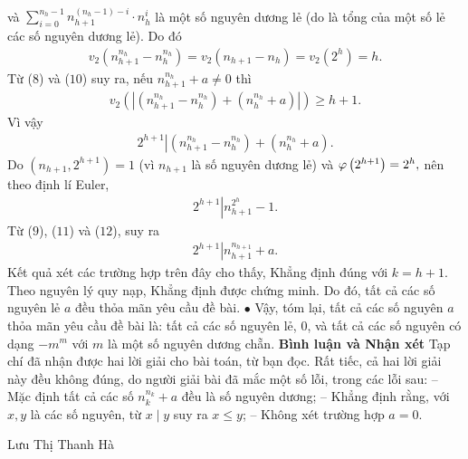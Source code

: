 \begin{multicols}{2}
\begin{align*}
	\end{align*}
	và $\sum\limits_{i = 0}^{{n_h} - 1} {n_{h + 1}^{\left( {{n_h} - 1} \right) - i} \cdot n_h^i}$  là một số nguyên dương lẻ (do là tổng của một số lẻ các số nguyên dương lẻ).
	\vskip 0.05cm
	Do đó
	\begin{align*}
		{v_2}\left( {n_{h + 1}^{{n_h}} - n_h^{{n_h}}} \right) = {v_2}\left( {{n_{h + 1}} - {n_h}} \right) = {v_2}\left( {{2^h}} \right) = h. \tag{$10$}
	\end{align*}
	Từ ($8$) và ($10$) suy ra, nếu  $n_{h + 1}^{{n_h}} + a \ne 0$ thì
	\begin{align*}
		{v_2}\left( {\left| {\left( {n_{h + 1}^{{n_h}} - n_h^{{n_h}}} \right) + \left( {n_h^{{n_h}} + a} \right)} \right|} \right) \ge h + 1.
	\end{align*}
	Vì vậy
	\begin{align*}
		{2^{h + 1}}\left| {\left( {n_{h + 1}^{{n_h}} - n_h^{{n_h}}} \right) + \left( {n_h^{{n_h}} + a} \right)} \right.. \tag{$11$}
	\end{align*}
	Do $\left( {{n_{h + 1}},{2^{h + 1}}} \right) = 1$  (vì ${n_{h + 1}}$  là số nguyên dương lẻ) và ${\rm{\varphi }}\left( {{2^{h + 1}}} \right) = {2^h},$  nên theo định lí Euler,
	\begin{align*}
		{2^{h + 1}}\left| {n_{h + 1}^{{2^h}} - 1} \right..\tag{$12$}
	\end{align*}
	Từ ($9$), ($11$) và ($12$), suy ra
	\begin{align*}
		{2^{h + 1}}\left| {n_{h + 1}^{{n_{h + 1}}} + a} \right..
	\end{align*}
	Kết quả xét các trường hợp trên đây cho thấy, Khẳng định đúng với $k = h + 1$.
	\vskip 0.05cm
	Theo nguyên lý quy nạp, Khẳng định được chứng minh.
	\vskip 0.05cm
	Do đó, tất cả các số nguyên lẻ $a$ đều thỏa mãn yêu cầu đề bài.
	\vskip 0.05cm
	$\bullet$ Vậy, tóm lại, tất cả các số nguyên $a$ thỏa mãn yêu cầu đề bài là: tất cả các số nguyên lẻ, $0$, và tất cả các số nguyên có dạng $-m^m$  với $m$ là một số nguyên dương chẵn.
	\vskip 0.05cm
	\textbf{Bình luận và Nhận xét}
	\vskip 0.05cm
	Tạp chí đã nhận được hai lời giải cho bài toán, từ bạn đọc. Rất tiếc, cả hai lời giải này đều không đúng, do người giải bài đã mắc một số lỗi, trong các lỗi sau:
	\vskip 0.05cm
	-- Mặc định tất cả các số $n_k^{{n_k}} + a$  đều là số nguyên dương;
	\vskip 0.05cm
	-- Khẳng định rằng, với $x, y$ là các số nguyên, từ $x \mid y$ suy ra $x \le y$;
	\vskip 0.05cm
	-- Không xét trường hợp $a = 0$.
	\begin{flushright}
		Lưu Thị Thanh Hà
	\end{flushright}
\end{multicols}
